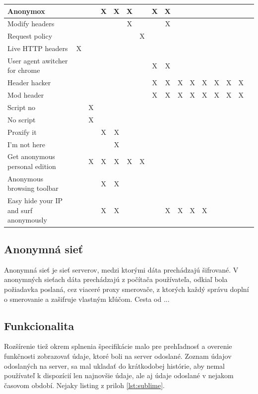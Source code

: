 \begin{table}[!htbp]
\begin{center}
\begin{tabular}{p{4cm}|c|c|c|c|c|c|c|c|c|c|c|c|c|c|c}
Anonymox &  && X & X & X &  & X & X & & & & & & \\  \hline
Modify headers & & &  &  & X &  &  & X &  &  &  & & &  \\  \hline
Request policy & & &  &  & & X  &  &  &  &  &  & & &   \\  \hline
Live HTTP headers & X& &  &  & &  &  &  &  &  &  & & &   \\  \hline
User agent awitcher for chrome & & &  &  & &  & X & X &  &  &  & & &   \\  \hline
Header hacker & & &  &  & &  & X & X & X & X & X & X & X & X	\\  \hline
Mod header & & &  &  & &  & X & X & X & X & X & X & X & X	\\  \hline
Script no & &X &  &  & &  &  &  &  &  &  &  &  &	 \\  \hline
No script & &X &  &  & &  &  &  &  &  &  &  &  &	 \\  \hline
Proxify it & & &X  & X & &  &  &  &  &  &  &  &  &	 \\  \hline
I'm not here & & &  & X & &  &  &  &  &  &  &  &  &	 \\  \hline
Get anonymous personal edition & &X &X &X &X&X &  &  &  &  &  &  &  &	 \\  \hline
Anonymous browsing toolbar & & & X & X & &  &  &  &  &  &  &  &  &	 \\  \hline
Easy hide your IP and surf anonymously & & & X & X& &  &  & X & X & X & X &  &  &	 \\  \hline
\end{tabular}
\end{center}
\end{table}

\subsection{Anonymná sieť}
\noindent Anonymná sieť je sieť serverov, medzi ktorými dáta prechádzajú šifrované. V anonymných sieťach dáta prechádzajú z počítača používateľa, odkiaľ bola požiadavka poslaná, cez viaceré proxy smerovače, z ktorých každý správu doplní o smerovanie a zašifruje vlastným kľúčom. Cesta od ...


\subsection{Funkcionalita}
\noindent  Rozšírenie tiež okrem splnenia špecifikácie malo pre prehľadnosť a overenie funkčnosti zobrazovať údaje, ktoré boli na server odoslané. Zoznam údajov odoslaných na server, sa mal ukladať do krátkodobej histórie, aby nemal používateľ k dispozícií len najnovšie údaje, ale aj údaje odoslané v nejakom časovom období. Nejaky listing z priloh \ref{lst:sublime}.

